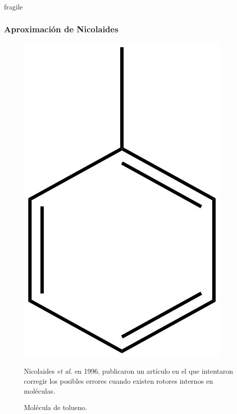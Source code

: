 \documentclass{beamer}
\begin{document}
\begin{frame}{fragile}
\frametitle{Aproximación de Nicolaides}
\begin{figure}
\includegraphics[scale=.2]{images/toluene.png}
\caption{Molécula de tolueno.}
Nicolaides \textit{et al.} en 1996, publicaron un artículo en el que intentaron corregir los posibles errores cuando existen rotores internos en moléculas.
\end{figure}
\end{frame}
\end{document}
